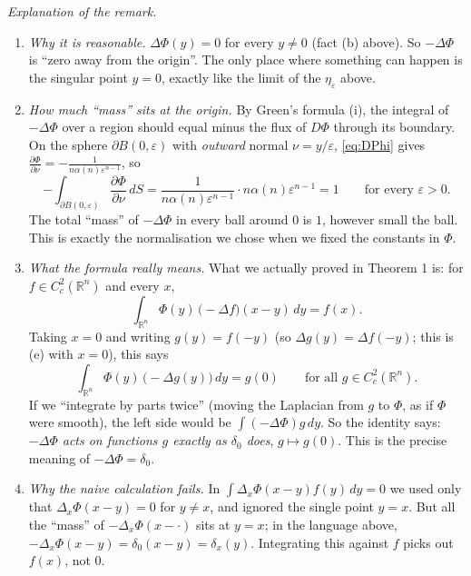 \documentclass[11pt]{article}
\theoremstyle{plain}
\theoremstyle{definition}
\theoremstyle{remark}
\begin{document}
\emph{Explanation of the remark.}
\begin{enumerate}
    \item \emph{Why it is reasonable.} $\Delta\Phi(y) = 0$ for every $y \neq 0$ (fact (b) above). So $-\Delta\Phi$ is ``zero away from the origin''. The only place where something can happen is the singular point $y = 0$, exactly like the limit of the $\eta_\varepsilon$ above.
    \item \emph{How much ``mass'' sits at the origin.} By Green's formula (i), the integral of $-\Delta\Phi$ over a region should equal minus the flux of $D\Phi$ through its boundary. On the sphere $\partial B(0,\varepsilon)$ with \emph{outward} normal $\nu = y/\varepsilon$, \eqref{eq:DPhi} gives $\frac{\partial \Phi}{\partial\nu} = -\frac{1}{n\alpha(n)\varepsilon^{n-1}}$, so
    $$ -\int_{\partial B(0,\varepsilon)} \frac{\partial\Phi}{\partial\nu}\, dS = \frac{1}{n\alpha(n)\varepsilon^{n-1}}\cdot n\alpha(n)\varepsilon^{n-1} = 1 \qquad \text{for every } \varepsilon > 0. $$
    The total ``mass'' of $-\Delta\Phi$ in every ball around $0$ is $1$, however small the ball. This is exactly the normalisation we chose when we fixed the constants in $\Phi$.
    \item \emph{What the formula really means.} What we actually proved in Theorem 1 is: for $f \in C^2_c(\mathbb{R}^n)$ and every $x$,
    $$ \int_{\mathbb{R}^n} \Phi(y)\,\big(-\Delta f\big)(x-y)\, dy = f(x). $$
    Taking $x = 0$ and writing $g(y) = f(-y)$ (so $\Delta g(y) = \Delta f(-y)$; this is (e) with $x = 0$), this says
    $$ \int_{\mathbb{R}^n} \Phi(y)\,\big(-\Delta g(y)\big)\, dy = g(0) \qquad \text{for all } g \in C^2_c(\mathbb{R}^n). $$
    If we ``integrate by parts twice'' (moving the Laplacian from $g$ to $\Phi$, as if $\Phi$ were smooth), the left side would be $\int (-\Delta\Phi) g\, dy$. So the identity says: \emph{$-\Delta\Phi$ acts on functions $g$ exactly as $\delta_0$ does}, $g \mapsto g(0)$. This is the precise meaning of $-\Delta\Phi = \delta_0$.
    \item \emph{Why the naive calculation fails.} In $\int \Delta_x \Phi(x-y)f(y)\, dy = 0$ we used only that $\Delta_x\Phi(x-y) = 0$ for $y \neq x$, and ignored the single point $y = x$. But all the ``mass'' of $-\Delta_x\Phi(x - \cdot)$ sits at $y = x$; in the language above, $-\Delta_x\Phi(x-y) = \delta_0(x-y) = \delta_x(y)$. Integrating this against $f$ picks out $f(x)$, not $0$.
\end{enumerate}

\end{document}
